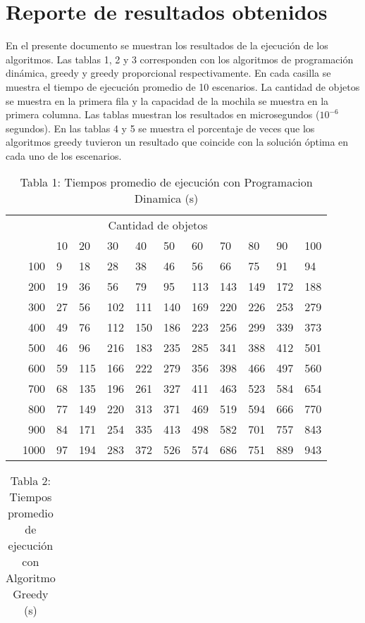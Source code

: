 \documentclass{article}
\begin{document}
\section*{Reporte de resultados obtenidos}
En el presente documento se muestran los resultados de la ejecución de los algoritmos. Las tablas 1, 2 y 3 corresponden con los algoritmos de programación dinámica, greedy y greedy proporcional respectivamente. En cada casilla se muestra el tiempo de ejecución promedio de 10 escenarios. La cantidad de objetos se muestra en la primera fila y la capacidad de la mochila se muestra en la primera columna. Las tablas muestran los resultados en microsegundos ($10^{-6}$ segundos).
En las tablas 4 y 5 se muestra el porcentaje de veces que los algoritmos greedy tuvieron un resultado que coincide con la solución óptima en cada uno de los escenarios.
\begin{center}
\begin{table}[ht]
\centering
\caption*{Tabla 1: Tiempos promedio de ejecución con Programacion Dinamica (\textmu s)}
\label{1}
\begin{tabularx}{0.8\textwidth}{Xr|XXXXXXXXXX}
&\multicolumn{10}{c}{Cantidad de objetos} \\
&&10&20&30&40&50&60&70&80&90&100\\\hline
\parbox[t]{2mm}{}&100&9&18&28&38&46&56&66&75&91&94\\
&200&19&36&56&79&95&113&143&149&172&188\\
&300&27&56&102&111&140&169&220&226&253&279\\
&400&49&76&112&150&186&223&256&299&339&373\\
&500&46&96&216&183&235&285&341&388&412&501\\
&600&59&115&166&222&279&356&398&466&497&560\\
&700&68&135&196&261&327&411&463&523&584&654\\
&800&77&149&220&313&371&469&519&594&666&770\\
&900&84&171&254&335&413&498&582&701&757&843\\
&1000&97&194&283&372&526&574&686&751&889&943\\
\end{tabularx}
\end{table}
\begin{table}[ht]
\centering
\caption*{Tabla 2: Tiempos promedio de ejecución con Algoritmo Greedy (\textmu s)}
\label{2}
\begin{tabularx}{0.8\textwidth}{Xr|XXXXXXXXXX}

\end{tabularx}
\end{table}
\end{center}
\end{document}
